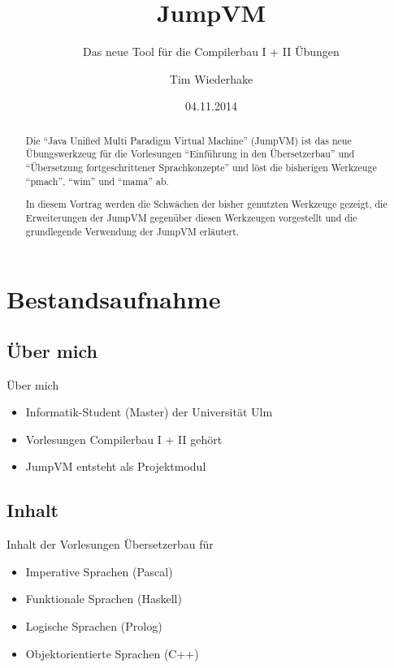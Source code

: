 \documentclass{beamer}
\title{JumpVM}
\subtitle{Das neue Tool für die Compilerbau I + II Übungen}
\author{Tim Wiederhake}
\institute{Institut für Programmiermethodik und Compilerbau}
\date{04.11.2014}
\begin{document}
\begin{frame}
	\maketitle
\end{frame}

\begin{abstract}
	Die \enquote{Java Unified Multi Paradigm Virtual Machine} (JumpVM) ist das 
	neue Übungswerkzeug für die Vorlesungen \enquote{Einführung in den 
	Übersetzerbau} und \enquote{Übersetzung fortgeschrittener Sprachkonzepte} 
	und löst die bisherigen Werkzeuge \enquote{pmach}, \enquote{wim} und 
	\enquote{mama} ab.
	
	In diesem Vortrag werden die Schwächen der bisher genutzten Werkzeuge 
	gezeigt, die Erweiterungen der JumpVM gegenüber diesen Werkzeugen 
	vorgestellt und die grundlegende Verwendung der JumpVM erläutert.
\end{abstract}

\begin{frame}
	\tableofcontents
\end{frame}

\section{Bestandsaufnahme}
\subsection*{Über mich}
\begin{frame}{Über mich}
	\begin{itemize}
	\item Informatik-Student (Master) der Universität Ulm
	\item Vorlesungen Compilerbau I + II gehört
	\item JumpVM entsteht als Projektmodul
	\end{itemize}
\end{frame}

\subsection*{Inhalt}
\begin{frame}{Inhalt der Vorlesungen}
	Übersetzerbau für
	\begin{itemize}
	\item Imperative Sprachen (Pascal)
	\item Funktionale Sprachen (Haskell)
	\item Logische Sprachen (Prolog)
	\item Objektorientierte Sprachen (C++)
	\end{itemize}
\end{frame}
\end{document}

